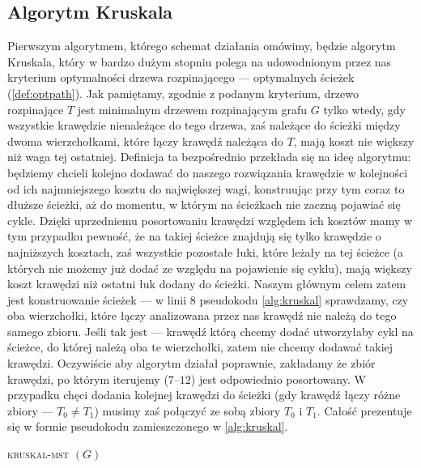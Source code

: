 \subsection{Algorytm Kruskala}

Pierwszym algorytmem, którego schemat działania omówimy, będzie algorytm Kruskala, który w bardzo dużym stopniu polega na udowodnionym przez nas kryterium optymalności drzewa rozpinającego --- optymalnych ścieżek (\ref{def:optpath}). Jak pamiętamy, zgodnie z podanym kryterium, drzewo rozpinające $T$ jest minimalnym drzewem rozpinającym grafu $G$ tylko wtedy, gdy wszystkie krawędzie nienależące do tego drzewa, zaś należące do ścieżki między dwoma wierzchołkami, które łączy krawędź należąca do $T$, mają koszt nie większy niż waga tej ostatniej. Definicja ta bezpośrednio przekłada się na ideę algorytmu: będziemy chcieli kolejno dodawać do naszego rozwiązania krawędzie w kolejności od ich najmniejszego kosztu do największej wagi, konstruując przy tym coraz to dłuższe ścieżki, aż do momentu, w którym na ścieżkach nie zaczną pojawiać się cykle. Dzięki uprzedniemu posortowaniu krawędzi względem ich kosztów mamy w tym przypadku pewność, że na takiej ścieżce znajdują się tylko krawędzie o najniższych kosztach, zaś wszystkie pozostałe łuki, które leżały na tej ścieżce (a których nie możemy już dodać ze względu na pojawienie się cyklu), mają większy koszt krawędzi niż ostatni łuk dodany do ścieżki. Naszym głównym celem zatem jest konstruowanie ścieżek --- w linii $8$ pseudokodu \ref{alg:kruskal} sprawdzamy, czy oba wierzchołki, które łączy analizowana przez nas krawędź nie należą do tego samego zbioru. Jeśli tak jest --- krawędź którą chcemy dodać utworzyłaby cykl na ścieżce, do której należą oba te wierzchołki, zatem nie chcemy dodawać takiej krawędzi. Oczywiście aby algorytm działał poprawnie, zakładamy że zbiór krawędzi, po którym iterujemy ($7$--$12$) jest odpowiednio posortowany. W przypadku chęci dodania kolejnej krawędzi do ścieżki (gdy krawędź łączy różne zbiory --- $T_{0} \neq T_{1}$) musimy zaś połączyć ze sobą zbiory $T_{0}$ i $T_{1}$. Całość prezentuje się w formie pseudokodu zamieszczonego w \ref{alg:kruskal}.

\begin{pseudokod}[!htbp]
	\DontPrintSemicolon
	\caption{\textsc{kruskal-mst} $\left( G \right)$}
	\label{alg:kruskal}
\end{pseudokod}

